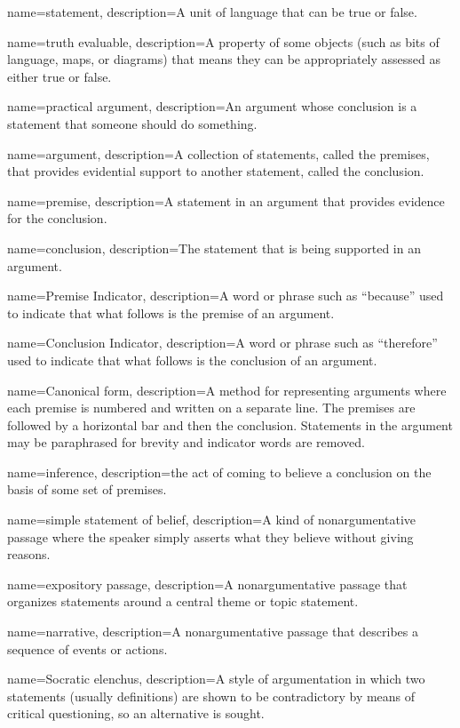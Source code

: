 {
name=statement,
description={A unit of language that can be true or false.}
}

{
name=truth evaluable,
description={A property of some objects (such as bits of language, maps, or diagrams) that means they can be appropriately assessed as either true or false.}
}

{
name=practical argument,
description={An argument whose conclusion is a statement that someone should do something.}
}


{
name=argument,
description={A collection of statements, called the premises, that provides evidential support to another statement, called the conclusion.}
}

{
name=premise,
description={A statement in an argument that provides evidence for the conclusion.}
}

{
name=conclusion,
description={The statement that is being supported in an argument.}
}

{
name=Premise Indicator,
description={A word or phrase such as ``because'' used to indicate that what follows is the premise of an argument.}
}

{
name=Conclusion Indicator,
description={A word or phrase such as ``therefore'' used to indicate that what follows is the conclusion of an argument.}
}

{
name=Canonical form,
description={A method for representing arguments where each premise is numbered and written on a separate line. The premises are followed by a horizontal bar and then the conclusion. Statements in the argument may be paraphrased for brevity and indicator words are removed.}
}

{
name=inference,
description={the act of coming to believe a conclusion on the basis of some set of premises.}
}

{
name=simple statement of belief,
description={A kind of nonargumentative passage where the speaker simply asserts what they believe without giving reasons. }
}

{
name=expository passage,
description={A nonargumentative passage that organizes statements around a central theme or topic statement.}
}

{
name=narrative,
description={A nonargumentative passage that describes a sequence of events or actions.}
}

{
name=Socratic elenchus,
description={A style of argumentation in which two statements (usually definitions) are shown to be contradictory by means of critical questioning, so an alternative is sought.}
}
